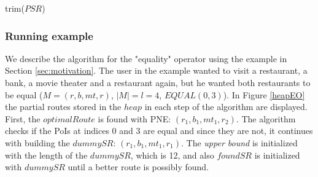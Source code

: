 \begin{procedure}[H]
\caption{trim($PSR$)}
\label{proc:trim}
	
\end{procedure}

\subsubsection{Running example}
We describe the algorithm for the "equality" operator using the example in Section \ref{sec:motivation}. The user in the example wanted to visit a restaurant, a bank, a movie theater and a restaurant again, but he wanted both restaurants to be equal ($M = (r, b, mt, r)$, $|M| = l = 4$, $EQUAL(0, 3)$). In Figure \ref{heapEO} the partial routes stored in the $heap$ in each step of the algorithm are displayed.
First, the $optimalRoute$ is found with PNE: $(r_1, b_1, mt_1, r_2)$. The algorithm checks if the PoIs at indices 0 and 3 are equal and since they are not, it continues with building the $dummySR$: $(r_1, b_1, mt_1, r_1)$. The \textit{upper bound} is initialized with the length of the $dummySR$, which is 12, and also $foundSR$ is initialized with $dummySR$ until a better route is possibly found.
